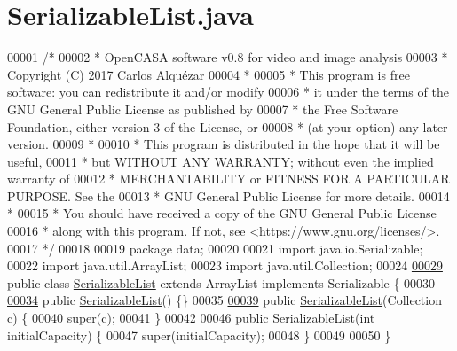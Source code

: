 \hypertarget{_serializable_list_8java_source}{}\section{Serializable\+List.\+java}
\label{_serializable_list_8java_source}

\begin{DoxyCode}
00001 \textcolor{comment}{/*}
00002 \textcolor{comment}{ *   OpenCASA software v0.8 for video and image analysis}
00003 \textcolor{comment}{ *   Copyright (C) 2017  Carlos Alquézar}
00004 \textcolor{comment}{ *}
00005 \textcolor{comment}{ *   This program is free software: you can redistribute it and/or modify}
00006 \textcolor{comment}{ *   it under the terms of the GNU General Public License as published by}
00007 \textcolor{comment}{ *   the Free Software Foundation, either version 3 of the License, or}
00008 \textcolor{comment}{ *   (at your option) any later version.}
00009 \textcolor{comment}{ *}
00010 \textcolor{comment}{ *   This program is distributed in the hope that it will be useful,}
00011 \textcolor{comment}{ *   but WITHOUT ANY WARRANTY; without even the implied warranty of}
00012 \textcolor{comment}{ *   MERCHANTABILITY or FITNESS FOR A PARTICULAR PURPOSE.  See the}
00013 \textcolor{comment}{ *   GNU General Public License for more details.}
00014 \textcolor{comment}{ *}
00015 \textcolor{comment}{ *   You should have received a copy of the GNU General Public License}
00016 \textcolor{comment}{ *   along with this program.  If not, see <https://www.gnu.org/licenses/>.}
00017 \textcolor{comment}{*/}    
00018 
00019 \textcolor{keyword}{package }data;
00020 
00021 \textcolor{keyword}{import} java.io.Serializable;
00022 \textcolor{keyword}{import} java.util.ArrayList;
00023 \textcolor{keyword}{import} java.util.Collection;
00024 
\hypertarget{_serializable_list_8java_source_l00029}{}\hyperlink{classdata_1_1_serializable_list}{00029} \textcolor{keyword}{public} \textcolor{keyword}{class }\hyperlink{classdata_1_1_serializable_list}{SerializableList} \textcolor{keyword}{extends} ArrayList implements Serializable \{
00030 
\hypertarget{_serializable_list_8java_source_l00034}{}\hyperlink{classdata_1_1_serializable_list_acd84de737b5a34dc1f239e6b95ae0dc8}{00034}   \textcolor{keyword}{public} \hyperlink{classdata_1_1_serializable_list_acd84de737b5a34dc1f239e6b95ae0dc8}{SerializableList}() \{\}
00035 
\hypertarget{_serializable_list_8java_source_l00039}{}\hyperlink{classdata_1_1_serializable_list_ad709ead5deacaba5d351ce90f5379e6e}{00039}   \textcolor{keyword}{public} \hyperlink{classdata_1_1_serializable_list_ad709ead5deacaba5d351ce90f5379e6e}{SerializableList}(Collection c) \{
00040     super(c);
00041   \}
00042 
\hypertarget{_serializable_list_8java_source_l00046}{}\hyperlink{classdata_1_1_serializable_list_a3e055eba65ba1ec82ff42691f7a4b4d4}{00046}   \textcolor{keyword}{public} \hyperlink{classdata_1_1_serializable_list_a3e055eba65ba1ec82ff42691f7a4b4d4}{SerializableList}(\textcolor{keywordtype}{int} initialCapacity) \{
00047     super(initialCapacity);
00048   \}
00049 
00050 \}
\end{DoxyCode}
